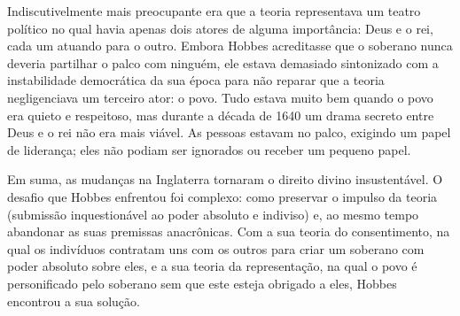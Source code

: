 Indiscutivelmente mais preocupante era que a teoria representava um teatro político no qual havia apenas dois atores de alguma importância: Deus e o rei, cada um atuando para o outro. Embora Hobbes acreditasse que o soberano nunca deveria partilhar o palco com ninguém, ele estava demasiado sintonizado com a instabilidade democrática da sua época para não reparar que a teoria negligenciava um terceiro ator: o povo. Tudo estava muito bem quando o povo era quieto e respeitoso, mas durante a década de 1640 um drama secreto entre Deus e o rei não era mais viável. As pessoas estavam no palco, exigindo um papel de liderança; eles não podiam ser ignorados ou receber um pequeno papel.
 
\par
 
Em suma, as mudanças na Inglaterra tornaram o direito divino insustentável. O desafio que Hobbes enfrentou foi complexo: como preservar o impulso da teoria (submissão inquestionável ao poder absoluto e indiviso) e, ao mesmo tempo abandonar as suas premissas anacrônicas. Com a sua teoria do consentimento, na qual os indivíduos contratam uns com os outros para criar um soberano com poder absoluto sobre eles, e a sua teoria da representação, na qual o povo é personificado pelo soberano sem que este esteja obrigado a eles, Hobbes encontrou a sua solução.
 
\par
 
